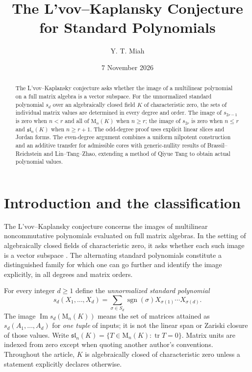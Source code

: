 \documentclass[11pt]{amsart}
\title[L'vov--Kaplansky for Standard Polynomials]{The L'vov--Kaplansky Conjecture for Standard Polynomials}
\author{Y. T. Miah}
\date{7 November 2026}
\newcommand{\Mat}{\mathrm{M}}
\newcommand{\im}{\operatorname{Im}}
\newcommand{\tr}{\operatorname{tr}}
\newcommand{\Sl}{\mathfrak{sl}}
\begin{document}
\begin{abstract}
The L'vov--Kaplansky conjecture asks whether the image of a multilinear
polynomial on a full matrix algebra is a vector subspace. For the
unnormalized standard polynomial $s_d$ over an algebraically closed field
$K$ of characteristic zero, the sets of individual matrix values are
determined in every degree and order. The image of $s_{2r-1}$ is zero
when $n<r$ and all of $\Mat_n(K)$ when $n\ge r$; the image of $s_{2r}$
is zero when $n\le r$ and $\Sl_n(K)$ when $n\ge r+1$.
The odd-degree proof uses explicit linear slices and Jordan forms.
The even-degree argument combines a uniform nilpotent construction and
an additive transfer for admissible cores with generic-nullity results
of Brassil--Reichstein and Lin--Tang--Zhao, extending a method of
Qiyue Tang to obtain actual polynomial values.
\end{abstract}
\maketitle

\section{Introduction and the classification}\label{sec:introduction}
The L'vov--Kaplansky conjecture concerns the images of multilinear
noncommutative polynomials evaluated on full matrix algebras. In the
setting of algebraically closed fields of characteristic zero, it asks
whether each such image is a vector subspace
\cite{KanelBelovMalevRowen2016,KanelBelovEtAl2020}.
The alternating standard polynomials constitute a distinguished family
for which one can go further and identify the image explicitly, in all
degrees and matrix orders.

For every integer $d\ge1$ define the \emph{unnormalized standard polynomial}
\begin{equation}\label{eq:standard}
 s_d(X_1,\ldots,X_d)=\sum_{\sigma\in S_d}\operatorname{sgn}(\sigma)
 X_{\sigma(1)}\cdots X_{\sigma(d)}.
\end{equation}
The image $\im s_d(\Mat_n(K))$ means the set of matrices attained as
$s_d(A_1,\ldots,A_d)$ for \emph{one tuple} of inputs; it is not the
linear span or Zariski closure of those values. Write
$\Sl_n(K)=\{T\in\Mat_n(K):\tr T=0\}$. Matrix units are indexed from
zero except when quoting another author's conventions. Throughout the
article, $K$ is algebraically closed of characteristic zero unless a
statement explicitly declares otherwise.
\end{document}
